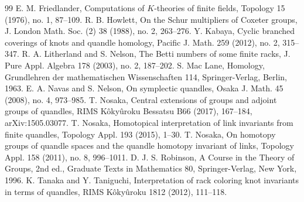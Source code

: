 \documentclass[10pt,a4paper]{amsart}
\begin{document}
\begin{thebibliography}{99}
 E. M. Friedlander, \newblock Computations of $K$-theories of finite fields, \newblock Topology 15 (1976), no. 1, 87--109.
 R. B. Howlett, \newblock On the Schur multipliers of Coxeter groups, \newblock J. London Math. Soc. (2) 38 (1988), no. 2, 263--276.
 Y. Kabaya, \newblock Cyclic branched coverings of knots and quandle homology, \newblock Pacific J. Math. 259 (2012), no. 2, 315--347.
 R. A. Litherland and S. Nelson, \newblock The Betti numbers of some finite racks, \newblock J. Pure Appl. Algebra 178 (2003), no. 2, 187--202.
 S. Mac Lane, \newblock Homology, \newblock Grundlehren der mathematischen Wissenschaften 114, \newblock Springer-Verlag, Berlin, 1963.
 E. A. Navas and S. Nelson, \newblock On symplectic quandles, \newblock Osaka J. Math. 45 (2008), no. 4, 973--985.
 T. Nosaka, \newblock Central extensions of groups and adjoint groups of quandles, \newblock RIMS K\^oky\^uroku Bessatsu B66 (2017), 167--184, \newblock arXiv:1505.03077.
 T. Nosaka, \newblock Homotopical interpretation of link invariants from finite quandles, \newblock Topology Appl. 193 (2015), 1--30.
 T. Nosaka, \newblock On homotopy groups of quandle spaces and the quandle homotopy invariant of links, \newblock Topology Appl. 158 (2011), no. 8, 996--1011.
 D. J. S. Robinson, \newblock A Course in the Theory of Groups, \newblock 2nd ed., Graduate Texts in Mathematics 80, \newblock Springer-Verlag, New York, 1996.
 K. Tanaka and Y. Taniguchi, \newblock Interpretation of rack coloring knot invariants in terms of quandles, \newblock RIMS K\^oky\^uroku 1812 (2012), 111--118.
\end{thebibliography}
\end{document}
